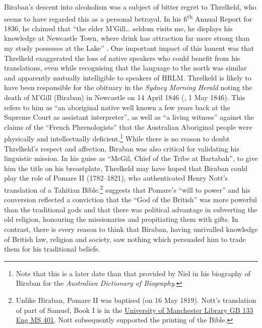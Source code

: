 Biraban’s descent into alcoholism was a subject of bitter regret to Threlkeld, who seems to have regarded this as a personal betrayal. In his 6\textsuperscript{th} Annual Report for 1836, he claimed that “the elder M’Gill… seldom visits me, he displays his knowledge at Newcastle Town, where drink has attraction far more strong than my study possesses at the Lake” \citep[133]{gunson_australian_1974a}. One important impact of this lament was that Threlkeld exaggerated the loss of native speakers who could benefit from his translations, even while recognising that the language to the north was similar and apparently mutually intelligible to speakers of HRLM. Threlkeld is likely to have been responsible for the obituary in the \textit{Sydney Morning Herald} noting the death of M’Gill (Biraban) in Newcastle on 14 April 1846 (\textit{}, 1 May 1846). This refers to him as “an aboriginal native well known a few years back at the Supreme Court as assistant interpreter”, as well as “a living witness” against the claims of the “French Phrenologists” that the Australian Aboriginal people were physically and intellectually deficient.\footnote{Note that this is a later date than that provided by Niel \citet{gunson_biraban_1966} in his biography of Biraban for the \textit{Australian Dictionary of Biography}.} While there is no reason to doubt Threlkeld’s respect and affection, Biraban was also critical for validating his linguistic mission. In his guise as “McGil, Chief of the Tribe at Bartabah”, to give him the title on his breastplate, Threlkeld may have hoped that Biraban could play the role of Pomare II (1782--1821), who authenticated Henry Nott’s translation of a Tahitian Bible.\footnote{Unlike Biraban, Pomare II was baptised (on 16 May 1819). Nott’s translation of part of Samuel, Book I is in the \href{https://archiveshub.jisc.ac.uk/search/archives/a4dfd14c-de1b-38de-9c4a-e9746d28242f?component=eb29e95e-031f-3e54-8c32-131797a03820}{University of Manchester Library GB 133 Eng MS 401}. Nott subsequently supported the printing of the Bible.} \citet[81]{gunson_pomare_1969} suggests that Pomare’s “will to power” and his conversion reflected a conviction that the “God of the British” was more powerful than the traditional gods and that there was political advantage in subverting the old religion, honouring the missionaries and propitiating them with gifts. In contrast, there is every reason to think that Biraban, having unrivalled knowledge of British law, religion and society, saw nothing which persuaded him to trade them for his traditional beliefs.

